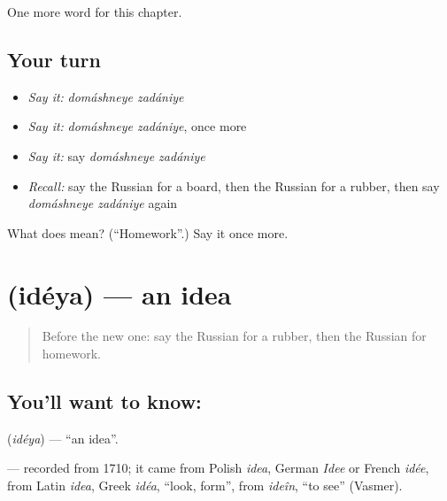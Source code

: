 \begin{grammarlens}[title={What you've built}]
One more word for this chapter.
\end{grammarlens}

\subsection*{Your turn}
\begin{itemize}
\raggedright
  \item \emph{Say it:} \emph{domáshneye zadániye}
  \item \emph{Say it:} \emph{domáshneye zadániye}, once more
  \item \emph{Say it:} say \emph{domáshneye zadániye}
  \item \emph{Recall:} say the Russian for a board, then the Russian for a rubber, then say \emph{domáshneye zadániye} again
\end{itemize}

\begin{tcolorbox}[breakable,colback=teal!4,colframe=teal!35!black,title={Before you move on}]
What does   mean? (\textquotedblleft{}Homework\textquotedblright{}.) Say it once more.
\end{tcolorbox}
\section[\texorpdfstring{\ru{идея} (idéya)}{идея (idéya)}]{ (idéya) — an idea}

\label{lesson:RU-C111-idea}



\begin{quote}
Before the new one: say the Russian for a rubber, then the Russian for homework.
\end{quote}

\subsection*{You'll want to know: }
\textbf{} (\emph{idéya}) — \textquotedblleft{}an idea\textquotedblright{}.

\begin{cousinweb}
\textbf{} — recorded from 1710; it came from Polish \emph{idea}, German \emph{Idee} or French \emph{idée}, from Latin \emph{idea}, Greek \emph{idéa}, \textquotedblleft{}look, form\textquotedblright{}, from \emph{ideîn}, \textquotedblleft{}to see\textquotedblright{} (Vasmer).
\end{cousinweb}

